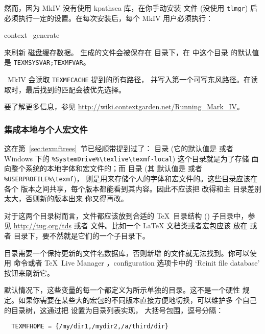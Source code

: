\documentclass{article}
\begin{document}
然而，因为 \ConTeXt{} MkIV 没有使用 kpathsea 库，在你手动安装
文件 (没使用 \verb+tlmgr+) 后必须执行一定的设置。在每次安装后，每个
MkIV 用户必须执行：

\begin{sverbatim}
context --generate
\end{sverbatim}
来刷新 \ConTeXt{} 磁盘缓存数据。
生成的文件会被保存在  目录下，在 \TL{} 中这个目录
的默认值是 \verb+TEXMSYSVAR;TEXMFVAR+。

\ConTeXt\ MkIV 会读取 \verb+TEXMFCACHE+ 提到的所有路径，
并写入第一个可写东风路径。在读取时，最后找到的匹配会被优先选择。

要了解更多信息，参见
\url{http://wiki.contextgarden.net/Running_Mark_IV}。

\subsubsection{集成本地与个人宏文件}
\label{sec:local-personal-macros}

这在第~\ref{sec:texmftrees}~节已经顺带提到过了：
目录 (它的默认值是  或者
Windows 下的 \verb|%SystemDrive%\texlive\texmf-local|) 这个目录就是为了存储
面向整个系统的本地字体和宏文件的；而  目录 (其
默认值是  或者 \verb|%USERPROFILE%\texmf|)，
则是用来存储个人的字体和宏文件的。这些目录应该在各个 \TL{}
版本之间共享，每个版本都能看到其内容。因此不应该把
 改得和主 \TL{} 目录差别太大，否则新的版本出来
你又得再改。

对于这两个目录树而言，文件都应该放到合适的 \TeX\ 目录结构 (\TDS)
子目录中，参见 \url{http://tug.org/tds} 或者
 文件。比如一个 \LaTeX{} 文档类或者宏包应该
放在  或者 
目录下，要不然就是它们的一个子目录下。

 目录需要一个保持更新的文件名数据库，否则新增
的文件就无法找到。你可以使用  命令或者
\TeX\ Live Manager \GUI{}，configuration 选项卡中的
`Reinit file database' 按钮来刷新它。

默认情况下，这些变量的每一个都定义为所示单独的目录。这不是一个硬性
规定。如果你需要在某些大的宏包的不同版本直接方便地切换，可以维护多
个自己的目录树，这通过把  设置为目录列表实现，
大括号包围，逗号分隔：

\begin{verbatim}
  TEXMFHOME = {/my/dir1,/mydir2,/a/third/dir}
\end{verbatim}
\end{document}
